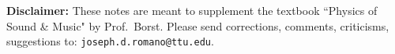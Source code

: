 \noindent
{\bf Disclaimer:} 
These notes are meant to supplement the textbook
``Physics of Sound \& Music" by Prof.~Borst.
Please send corrections, comments, criticisms, suggestions to:
{\tt joseph.d.romano@ttu.edu}.
